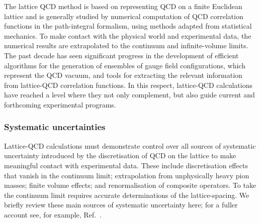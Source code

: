 The lattice QCD method is based on
representing QCD on a finite Euclidean lattice and is generally
studied by numerical computation of QCD correlation functions in the
path-integral formalism, using methods adapted from statistical
mechanics.
%
To make contact with the physical world and experimental
data, the numerical results are extrapolated to the continuum 
and infinite-volume limits.
%
The past decade has seen significant progress in
the development of efficient algorithms for the generation of
ensembles of gauge field configurations, which represent the QCD
vacuum, and tools for extracting the relevant information from lattice-QCD
correlation functions.
%
In this respect, lattice-QCD calculations have reached a level where
they not only complement, but also guide current and forthcoming
experimental programs.

\subsubsection{Systematic uncertainties}
Lattice-QCD calculations must demonstrate control over all sources of
systematic uncertainty introduced by the discretisation of QCD on the
lattice to make meaningful contact with experimental data.
%
These
include discretisation effects that vanish in the continuum limit;
extrapolation from unphysically heavy pion masses; finite volume
effects; and renormalisation of composite operators.
%
To take the 
continuum limit requires accurate determinations of the lattice-spacing. 
We briefly review these main sources of systematic
uncertainty here; for a fuller account see, for
example, Ref.~\cite{Aoki:2016frl}.

